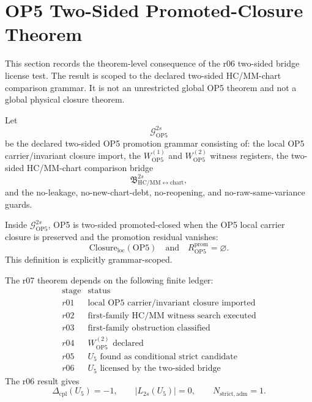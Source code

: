 
\section{OP5 Two-Sided Promoted-Closure Theorem}
\label{sec:v450-r07-op5-two-sided-promoted-closure-theorem}

This section records the theorem-level consequence of the r06 two-sided bridge
license test.  The result is scoped to the declared two-sided HC/MM-chart
comparison grammar.  It is not an unrestricted global OP5 theorem and not a
global physical closure theorem.

\begin{definition}
Let
\[
    \mathcal G_{\mathrm{OP5}}^{2s}
\]
be the declared two-sided OP5 promotion grammar consisting of: the local OP5
carrier/invariant closure import, the \(W_{\mathrm{OP5}}^{(1)}\) and
\(W_{\mathrm{OP5}}^{(2)}\) witness registers, the two-sided
HC/MM-chart comparison bridge
\[
    \mathfrak B_{\mathrm{HC/MM}\leftrightarrow\mathrm{chart}}^{2s},
\]
and the no-leakage, no-new-chart-debt, no-reopening, and no-raw-same-variance
guards.
\end{definition}

\begin{definition}
Inside \(\mathcal G_{\mathrm{OP5}}^{2s}\), OP5 is two-sided promoted-closed
when the OP5 local carrier closure is preserved and the promotion residual
vanishes:
\[
    \mathrm{Closure}_{\mathrm{loc}}(\mathrm{OP5})
    \quad\text{and}\quad
    R_{\mathrm{OP5}}^{\mathrm{prom}}=\varnothing.
\]
This definition is explicitly grammar-scoped.
\end{definition}

\begin{proposition}
The r07 theorem depends on the following finite ledger:
\[
\begin{array}{c|c}
\text{stage} & \text{status}\\
\hline
r01 & \text{local OP5 carrier/invariant closure imported}\\
r02 & \text{first-family HC/MM witness search executed}\\
r03 & \text{first-family obstruction classified}\\
r04 & W_{\mathrm{OP5}}^{(2)}\text{ declared}\\
r05 & U_5\text{ found as conditional strict candidate}\\
r06 & U_5\text{ licensed by the two-sided bridge}
\end{array}
\]
The r06 result gives
\[
    \Delta_{\mathrm{cpl}}(U_5)=-1,
    \qquad
    |L_{2s}(U_5)|=0,
    \qquad
    N_{\mathrm{strict,adm}}=1.
\]
\end{proposition}

